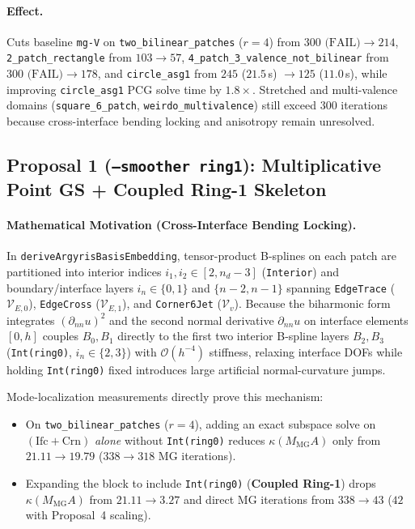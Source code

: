 \documentclass[10pt,a4paper]{article}
\begin{document}
\paragraph{Effect.}
Cuts baseline \texttt{mg-V} on \texttt{two\_bilinear\_patches} ($r=4$) from $300\text{ (FAIL)} \to 214$, \texttt{2\_patch\_rectangle} from $103 \to 57$, \texttt{4\_patch\_3\_valence\_not\_bilinear} from $300\text{ (FAIL)} \to 178$, and \texttt{circle\_asg1} from $245$ ($21.5\,$s) $\to 125$ ($11.0\,$s), while improving \texttt{circle\_asg1} PCG solve time by $1.8\times$. Stretched and multi-valence domains (\texttt{square\_6\_patch}, \texttt{weirdo\_multivalence}) still exceed 300 iterations because cross-interface bending locking and anisotropy remain unresolved.

\subsection{Proposal 1 (\texttt{--smoother ring1}): Multiplicative Point GS + Coupled Ring-1 Skeleton}
\paragraph{Mathematical Motivation (Cross-Interface Bending Locking).}
In \texttt{deriveArgyrisBasisEmbedding}, tensor-product B-splines on each patch are partitioned into interior indices $i_1, i_2 \in [2, n_d-3]$ (\texttt{Interior}) and boundary/interface layers $i_n \in \{0,1\}$ and $\{n-2,n-1\}$ spanning \texttt{EdgeTrace} ($\mathcal{V}_{E,0}$), \texttt{EdgeCross} ($\mathcal{V}_{E,1}$), and \texttt{Corner6Jet} ($\mathcal{V}_v$). Because the biharmonic form integrates $(\partial_{nn} u)^2$ and the second normal derivative $\partial_{nn} u$ on interface elements $[0, h]$ couples $B_0, B_1$ directly to the first two interior B-spline layers $B_2, B_3$ (\texttt{Int(ring0)}, $i_n \in \{2,3\}$) with $\mathcal{O}(h^{-4})$ stiffness, relaxing interface DOFs while holding \texttt{Int(ring0)} fixed introduces large artificial normal-curvature jumps.

Mode-localization measurements directly prove this mechanism:
\begin{itemize}
  \item On \texttt{two\_bilinear\_patches} ($r=4$), adding an exact subspace solve on $(\text{Ifc}+\text{Crn})$ \emph{alone} without \texttt{Int(ring0)} reduces $\kappa(M_{\text{MG}}A)$ only from $21.11 \to 19.79$ ($338 \to 318$ MG iterations).
  \item Expanding the block to include \texttt{Int(ring0)} (\textbf{Coupled Ring-1}) drops $\kappa(M_{\text{MG}}A)$ from $21.11 \to 3.27$ and direct MG iterations from $338 \to 43$ ($42$ with Proposal~4 scaling).
\end{itemize}
\end{document}
